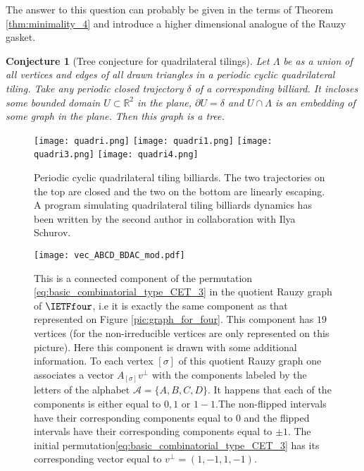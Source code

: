 \documentclass[12pt]{article}
\newtheorem{conjecture}{Conjecture}
\theoremstyle{definition}
\begin{document}
The answer to this question can probably be given in the terms of Theorem \ref{thm:minimality_4} and introduce a higher dimensional analogue of the Rauzy gasket.



\begin{conjecture}[Tree conjecture for quadrilateral tilings]\label{conj:tree_quadrilateral}
Let $\Lambda$ be as a union of all vertices and edges of all drawn triangles in a periodic cyclic quadrilateral tiling.
Take any periodic closed trajectory $\delta$ of a corresponding billiard. It incloses some bounded domain $U \subset \mathbb{R}^2$ in the plane, $\partial U = \delta$ and $U \cap \Lambda$ is an embedding of some graph in the plane. Then this graph is a \emph{tree}. 
\end{conjecture}

 \begin{figure}
\centering

\texttt{[image: quadri.png]}
\texttt{[image: quadri1.png]}
\texttt{[image: quadri3.png]}
\texttt{[image: quadri4.png]}

\caption[]{Periodic cyclic quadrilateral tiling billiards. The two trajectories on the top are closed and the two on the bottom are linearly escaping. A program simulating quadrilateral tiling billiards dynamics has been written by the second author in collaboration with Ilya Schurov.}\label{fig:quadrilaterals_simulations}
\end{figure}


\begin{landscape}
\begin{figure}
\centering
\texttt{[image: vec\_ABCD\_BDAC\_mod.pdf]}
\caption[]{
This is a connected component of the permutation \eqref{eq:basic_combinatorial_type_CET_3} in the quotient Rauzy graph of $\IETFfour$, i.e it is exactly the same component as that represented on Figure \ref{pic:graph_for_four}. This component has $19$ vertices (for the non-irreducible vertices are only represented on this picture). Here this component is drawn with some additional information. To each vertex $[\sigma]$ of this quotient Rauzy graph  one associates a vector $A_{[\sigma]} {v}^{\perp}$ with the components labeled by the letters of the alphabet $\mathcal{A}=\{A,B,C,D\}$. It happens that each of the components is either equal to $0,1$ or $1-1$.The non-flipped intervals have their corresponding components equal to $0$ and the flipped intervals have their corresponding components equal to $\pm 1$. The initial permutation\eqref{eq:basic_combinatorial_type_CET_3} has its corresponding vector equal to $v^{\perp}=(1,-1,1,-1)$.}
\label{fig:part_graph_4_connected_component_equivalence}
\end{figure}
\end{landscape}
\end{document}
